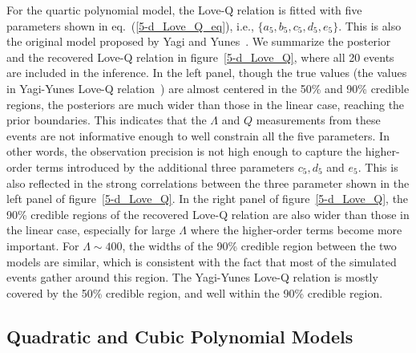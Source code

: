 \documentclass[a4paper,11pt]{article}
\begin{document}
For the quartic polynomial model, the Love-Q relation is fitted with five
parameters shown in eq.~(\ref{5-d_Love_Q_eq}), i.e., $\{a_5, b_5, c_5, d_5, e_5\}$. This is also the original
model proposed by Yagi and Yunes~\cite{Yagi:2013awa}. We summarize the
posterior and the recovered Love-Q relation in figure~\ref{5-d_Love_Q}, where
all 20 events are included in the inference.
 In the
left panel, though the true values (the values in Yagi-Yunes Love-Q
relation~\cite{Yagi:2013awa}) are almost centered in the 50\% and 90\% credible
regions, the posteriors are much wider than those in the linear case, reaching
the prior boundaries. This indicates that the $\Lambda$ and $Q$ measurements
from these events are not informative enough to well constrain all the five
parameters. In other words, the observation precision is not high enough to
capture the higher-order terms introduced by the additional three parameters
$c_5, d_5$ and $e_5$. This is also reflected in the strong correlations between
the three parameter shown in the left panel of figure~\ref{5-d_Love_Q}.
In the right panel of figure~\ref{5-d_Love_Q}, the 90\% credible regions of the
recovered Love-Q relation are also wider than those in the linear case,
especially for large $\Lambda$ where the higher-order terms become more
important. For $\Lambda \sim 400$, the widths of the 90\% credible region between
the two models are similar, which is consistent with the fact that most of the
simulated events gather around this region.
The Yagi-Yunes Love-Q relation is mostly covered by the 50\% credible
region, and well within the 90\% credible region.

\subsection{Quadratic and Cubic Polynomial Models}
\label{sec4_3}
\end{document}
